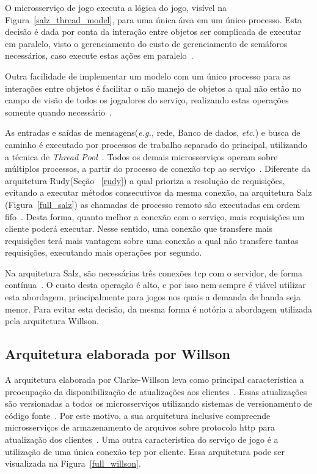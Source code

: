O microsserviço de jogo executa a lógica do jogo, visível na Figura~\ref{salz_thread_model}, para uma única área em um único processo.
%
Esta decisão é dada por conta da interação entre objetos ser complicada de executar em paralelo, visto o gerenciamento do custo de gerenciamento de semáforos necessários, caso execute estas ações em paralelo~\cite{salz_albion}.



Outra facilidade de implementar um modelo com um único processo para as interações entre objetos é facilitar o não manejo de objetos a qual não estão no campo de visão de todos os jogadores do serviço, realizando estas operações somente quando necessário~\cite{albion_online_unite, salz_albion}.


As entradas e saídas de mensagens(\textit{e.g.,} rede, Banco de dados, \textit{etc.}) e busca de caminho é executado por processos de trabalho separado do principal, utilizando a técnica de \textit{Thread Pool}~\cite{salz_albion, albion_online_unite, Ringler2014Dec}.
%
Todos os demais microsserviços operam sobre múltiplos processos, a partir do processo de conexão \ac{tcp} ao serviço~\cite{salz_albion}.
%
Diferente da arquitetura Rudy(Seção ~\ref{rudy}) a qual prioriza a resolução de requisições, evitando a executar métodos consecutivos da mesma conexão, na arquitetura Salz (Figura~\ref{full_salz}) as chamadas de processo remoto são executadas em ordem \ac{fifo}~\cite{salz_albion}.
%
Desta forma, quanto melhor a conexão com o serviço, mais requisições um cliente poderá executar.
%
Nesse sentido, uma conexão que transfere mais requisições terá mais vantagem sobre uma conexão a qual não transfere tantas requisições, executando mais operações por segundo.



Na arquitetura Salz, são necessárias três conexões \ac{tcp} com o servidor, de forma contínua~\cite{albion_online_unite}.
%
O custo desta operação é alto, e por isso nem sempre é viável utilizar esta abordagem, principalmente para jogos nos quais a demanda de banda seja menor.
%
Para evitar esta decisão, da mesma forma é notória a abordagem utilizada pela arquitetura Willson.



\subsection{Arquitetura elaborada por Willson}
\label{willson}


A arquitetura elaborada por Clarke-Willson leva como principal característica a preocupação da disponibilização de atualizações aos clientes~\cite{willson}.
%
Essas atualizações são versionadas a todos os microsserviços utilizando sistemas de versionamento de código fonte~\cite{stephenclarkewillson2017, willson}.
%
Por este motivo, a sua arquitetura inclusive compreende microsserviços de armazenamento de arquivos sobre protocolo \ac{http} para atualização dos clientes~\cite{stephenclarkewillson2017}.
%
Uma outra característica do serviço de jogo é a utilização de uma única conexão \ac{tcp} por cliente.
%
Essa arquitetura pode ser visualizada na Figura~\ref{full_willson}.


